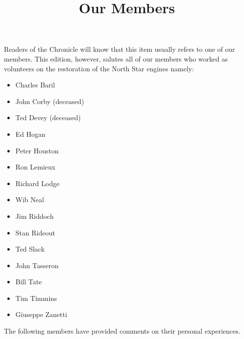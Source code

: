 %


\title{Our Members}

\maketitle




Readers of the Chronicle will know that this item usually refers to one of our
members. This edition, however, salutes all of our members who worked as
volunteers on the restoration of the North Star engines namely:

\begin{itemize}
  \item Charles Baril 
  \item John Corby (deceased)
  \item Ted Devey (deceased)
  \item Ed Hogan
  \item Peter Houston
  \item Ron Lemieux
  \item Richard Lodge
  \item Wib Neal
  \item Jim Riddoch
  \item Stan Rideout
  \item Ted Slack
  \item John Tasseron
  \item Bill Tate
  \item Tim Timmins
  \item Giuseppe Zanetti
\end{itemize}

The following members have provided comments on their personal experiences.

